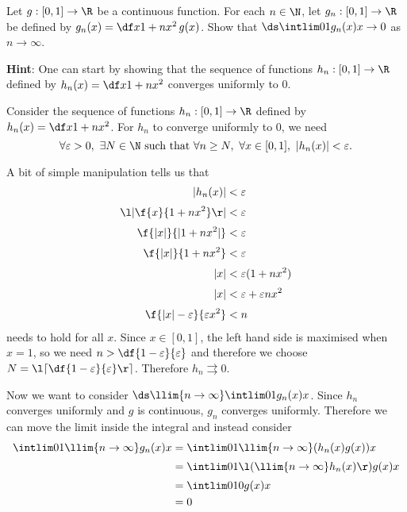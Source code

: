 \documentclass[a4paper]{article}
\begin{document}


\begin{questionbody}
Let $g : [0, 1] \to \R$ be a continuous function. For each $n \in \N$, let $g_n : [0, 1] \to \R$ be defined by $g_n(x) = \df x{1 + nx^2} \, g(x)$. Show that $\ds \intlim 01 {g_n(x)} x \to 0$ as $n \to \infty$.

\textbf{Hint}: One can start by showing that the sequence of functions $h_n : [0, 1] \to \R$ defined by $h_n(x) = \df x{1 + nx^2}$ converges uniformly to 0.
\end{questionbody}

Consider the sequence of functions $h_n : [0, 1] \to \R$ defined by $h_n(x) = \df x{1 + nx^2}$. For $h_n$ to converge uniformly to 0, we need \[
\forall \varepsilon > 0,\ \exists N \in \N \text{ such that } \forall n \ge N,\ \forall x \in [0, 1],\ |h_n(x)| < \varepsilon .
\]

A bit of simple manipulation tells us that \begin{align*}
|h_n(x)| &< \varepsilon \\[0.5ex]
\l| \f{x}{1 + nx^2} \r| &< \varepsilon \\[0.5ex]
\f{|x|}{|1 + nx^2|} &< \varepsilon \\[0.5ex]
\f{|x|}{1 + nx^2} &< \varepsilon \\[0.5ex]
|x| &< \varepsilon (1 + nx^2) \\[0.5ex]
|x| &< \varepsilon + \varepsilon nx^2 \\[0.5ex]
\f{|x| - \varepsilon}{\varepsilon x^2} &< n
\end{align*}
needs to hold for all $x$. Since $x \in [0, 1]$, the left hand side is maximised when $x=1$, so we need $n > \df{1-\varepsilon}{\varepsilon}$ and therefore we choose $N = \l\lceil \df{1 - \varepsilon}{\varepsilon} \r\rceil$. Therefore $h_n \rightrightarrows 0$.

Now we want to consider $\ds \llim{n \to \infty} \intlim 01 {g_n(x)} x$. Since $h_n$ converges uniformly and $g$ is continuous, $g_n$ converges uniformly. Therefore we can move the limit inside the integral and instead consider \begin{align*}
\intlim 01 {\llim{n \to \infty} g_n(x)} x &= \intlim 01 {\llim{n \to \infty} (h_n(x) g(x))} x \\[0.5ex]
&= \intlim 01 {\l( \llim{n \to \infty} h_n(x) \r) g(x)} x \\[0.5ex]
&= \intlim 01 {0 g(x)} x \\
&= 0
\end{align*}

\end{document}
